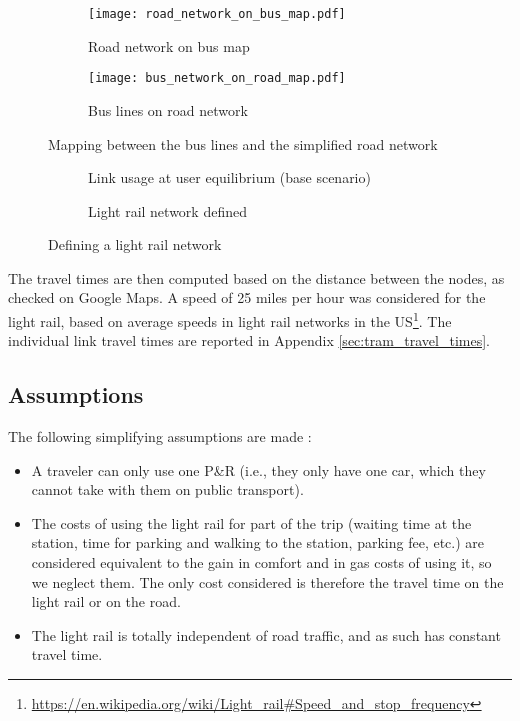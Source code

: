 \begin{figure}
    \centering
    \begin{subfigure}{.45\textwidth}
        \centering
        \texttt{[image: road\_network\_on\_bus\_map.pdf]}
        \caption{Road network on bus map}
    \end{subfigure}%
    \begin{subfigure}{.45\textwidth}
        \centering
        \texttt{[image: bus\_network\_on\_road\_map.pdf]}
        \caption{Bus lines on road network}
    \end{subfigure}%
    \caption{Mapping between the bus lines and the simplified road network}
    \label{fig:mapping_bus}
\end{figure}

\begin{figure}
    \centering
    \begin{subfigure}{.45\textwidth}
        \centering
        \resizebox{.7\textwidth}{!}{}
        \caption{Link usage at user equilibrium (base scenario)}
    \end{subfigure}%
    \begin{subfigure}{.45\textwidth}
        \centering
        \resizebox{.7\textwidth}{!}{}
        \caption{Light rail network defined}
    \end{subfigure}%
    \caption{Defining a light rail network}
    \label{fig:light_rail_network}
\end{figure}

The travel times are then computed based on the distance between the nodes, as checked on Google Maps. A speed of 25 miles per hour was considered for the light rail, based on average speeds in light rail networks in the US\footnote{\url{https://en.wikipedia.org/wiki/Light_rail\#Speed_and_stop_frequency}}. The individual link travel times are reported in Appendix \ref{sec:tram_travel_times}.


\subsection{Assumptions}

The following simplifying assumptions are made :
\begin{itemize}
    \item A traveler can only use one P\&R (i.e., they only have one car, which they cannot take with them on public transport).
    \item The costs of using the light rail for part of the trip (waiting time at the station, time for parking and walking to the station, parking fee, etc.) are considered equivalent to the gain in comfort and in gas costs of using it, so we neglect them. The only cost considered is therefore the travel time on the light rail or on the road.
    \item The light rail is totally independent of road traffic, and as such has constant travel time.
\end{itemize}


